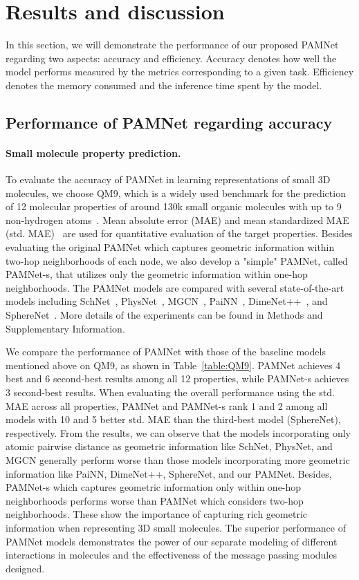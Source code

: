 \documentclass[fleqn,10pt]{wlscirep}
\newcommand{\method}{PAMNet\xspace}
\begin{document}
\section*{Results and discussion}
In this section, we will demonstrate the performance of our proposed \method regarding two aspects: accuracy and efficiency. Accuracy denotes how well the model performs measured by the metrics corresponding to a given task. Efficiency denotes the memory consumed and the inference time spent by the model.

\subsection*{Performance of \method regarding accuracy}
\paragraph{Small molecule property prediction.}
To evaluate the accuracy of \method in learning representations of small 3D molecules, we choose QM9, which is a widely used benchmark for the prediction of 12 molecular properties of around 130k small organic molecules with up to 9 non-hydrogen atoms~\cite{ramakrishnan2014quantum}. Mean absolute error (MAE) and mean standardized MAE (std. MAE)~\cite{klicpera_dimenet_2020} are used for quantitative evaluation of the target properties. Besides evaluating the original \method which captures geometric information within two-hop neighborhoods of each node, we also develop a "simple" \method, called \method-s, that utilizes only the geometric information within one-hop neighborhoods. The \method models are compared with several state-of-the-art models including SchNet~\cite{schutt2018schnetpack}, PhysNet~\cite{unke2019physnet}, MGCN~\cite{lu2019molecular}, PaiNN~\cite{schutt2021equivariant}, DimeNet++~\cite{klicpera_dimenetpp_2020}, and SphereNet~\cite{liu2022spherical}. More details of the experiments can be found in Methods and Supplementary Information. 

We compare the performance of \method with those of the baseline models mentioned above on QM9, as shown in Table~\ref{table:QM9}. \method achieves 4 best and 6 second-best results among all 12 properties, while \method-s achieves 3 second-best results. When evaluating the overall performance using the std. MAE across all properties, \method and \method-s rank 1 and 2 among all models with 10 and 5 better std. MAE than the third-best model (SphereNet), respectively. From the results, we can observe that the models incorporating only atomic pairwise distance  as geometric information like SchNet, PhysNet, and MGCN generally perform worse than those models incorporating more geometric information like PaiNN, DimeNet++, SphereNet, and our \method. Besides, \method-s which captures geometric information only within one-hop neighborhoods performs worse than \method which considers two-hop neighborhoods. These show the importance of capturing rich geometric information when representing 3D small molecules. The superior performance of \method models demonstrates the power of our separate modeling of different interactions in molecules and the effectiveness of the message passing modules designed.
\end{document}
